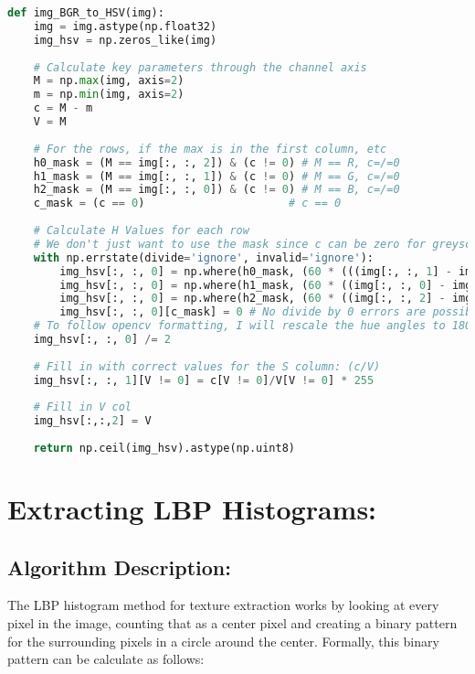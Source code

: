 \documentclass{article}
\begin{document}
\begin{lstlisting}[language=Python]
def img_BGR_to_HSV(img):
    img = img.astype(np.float32)
    img_hsv = np.zeros_like(img)
    
    # Calculate key parameters through the channel axis
    M = np.max(img, axis=2)
    m = np.min(img, axis=2)
    c = M - m
    V = M
    
    # For the rows, if the max is in the first column, etc
    h0_mask = (M == img[:, :, 2]) & (c != 0) # M == R, c=/=0
    h1_mask = (M == img[:, :, 1]) & (c != 0) # M == G, c=/=0
    h2_mask = (M == img[:, :, 0]) & (c != 0) # M == B, c=/=0
    c_mask = (c == 0)                      # c == 0
    
    # Calculate H Values for each row
    # We don't just want to use the mask since c can be zero for greyscale. So we want to only compute on the masks, by checking for where to input values in first.
    with np.errstate(divide='ignore', invalid='ignore'):
        img_hsv[:, :, 0] = np.where(h0_mask, (60 * (((img[:, :, 1] - img[:, :, 0]) / c) % 6)), img_hsv[:, :, 0])
        img_hsv[:, :, 0] = np.where(h1_mask, (60 * ((img[:, :, 0] - img[:, :, 2]) / c + 2)), img_hsv[:, :, 0])
        img_hsv[:, :, 0] = np.where(h2_mask, (60 * ((img[:, :, 2] - img[:, :, 1]) / c + 4)), img_hsv[:, :, 0])
        img_hsv[:, :, 0][c_mask] = 0 # No divide by 0 errors are possible here
    # To follow opencv formatting, I will rescale the hue angles to 180deg instead of 360
    img_hsv[:, :, 0] /= 2
    
    # Fill in with correct values for the S column: (c/V)
    img_hsv[:, :, 1][V != 0] = c[V != 0]/V[V != 0] * 255
    
    # Fill in V col
    img_hsv[:,:,2] = V
    
    return np.ceil(img_hsv).astype(np.uint8)
\end{lstlisting}


\section{Extracting LBP Histograms:} %
\subsection{Algorithm Description:}
The LBP histogram method for texture extraction works by looking at every pixel in the image, counting that as a center pixel and creating a binary pattern for the surrounding pixels in a circle around the center. Formally, this binary pattern can be calculate as follows:
\end{document}
